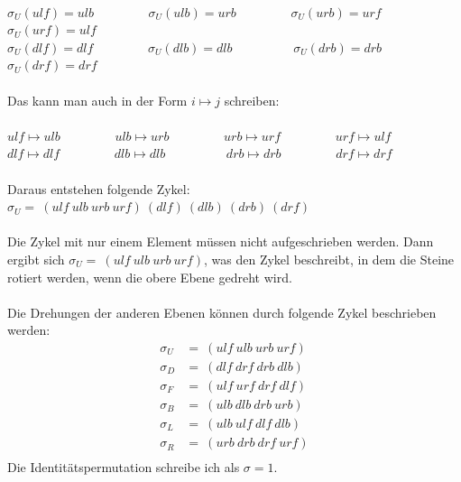 \documentclass[12pt,a4paper, usenames, dvipsnames]{article}
\begin{document}
\ \\
$\sigma_U(ulf)=ulb$ \ \ \ \ \ \ \ \ $\sigma_U(ulb)=urb$ \ \ \ \ \ \ \ \ $\sigma_U(urb)=urf$ \ \ \ \ \ \ \ \ $\sigma_U(urf)=ulf$ \\
$\sigma_U(dlf)=dlf$ \ \ \ \ \ \ \ \ $\sigma_U(dlb)=dlb$ \ \ \ \ \ \ \ \ \ $\sigma_U(drb)=drb$ \ \ \ \ \ \ \ \ $\sigma_U(drf)=drf$ \\
\\
Das kann man auch in der Form $i \mapsto j$ schreiben: \\
\\
$ulf \mapsto ulb$ \ \ \ \ \ \ \ \ $ulb \mapsto urb$ \ \ \ \ \ \ \ \ $urb \mapsto urf$ \ \ \ \ \ \ \ \ $urf \mapsto ulf$ \\
$dlf \mapsto dlf$ \ \ \ \ \ \ \ \ $dlb \mapsto dlb$ \ \ \ \ \ \ \ \ \ $drb \mapsto drb$ \ \ \ \ \ \ \ \ $drf \mapsto drf$ \\
\\
Daraus entstehen folgende Zykel: $\sigma_U = \ (ulf \ ulb \ urb \ urf)\ (dlf)\ (dlb)\ (drb)\ (drf)$ \\ \\
Die Zykel mit nur einem Element müssen nicht aufgeschrieben werden. Dann ergibt sich $\sigma_U = \ (ulf \ ulb \ urb \ urf)$, was den Zykel beschreibt, in dem die Steine rotiert werden, wenn die obere Ebene gedreht wird. \\
\\
Die Drehungen der anderen Ebenen können durch folgende Zykel beschrieben werden: \\
\begin{align*}
\sigma_U & =\ (ulf \ ulb \ urb \ urf) \\
\sigma_D & =\ (dlf \ drf \ drb \ dlb) \\
\sigma_F & =\ (ulf \ urf \ drf \ dlf) \\
\sigma_B & =\ (ulb \ dlb \ drb \ urb) \\
\sigma_L & =\ (ulb \ ulf \ dlf \ dlb) \\
\sigma_R & =\ (urb \ drb \ drf \ urf) \\
\end{align*}
Die Identitätspermutation schreibe ich als $\sigma = 1$.










\end{document}
